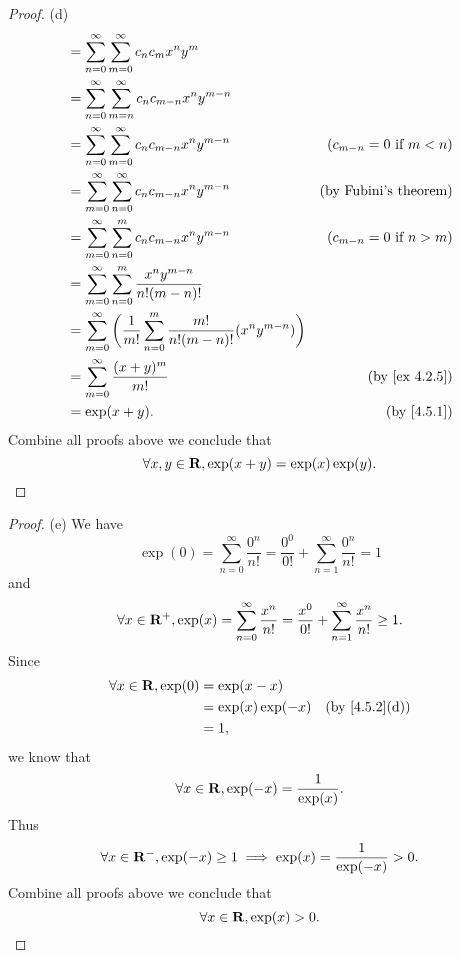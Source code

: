 \begin{proof}{(d)}
\begin{align*}
     & = \sum_{n = 0}^\infty \sum_{m = 0}^\infty c_n c_m x^n y^m                                                                                \\
     & = \sum_{n = 0}^\infty \sum_{m = n}^\infty c_n c_{m - n} x^n y^{m - n}                                                                    \\
     & = \sum_{n = 0}^\infty \sum_{m = 0}^\infty c_n c_{m - n} x^n y^{m - n}                                & (c_{m - n} = 0 \text{ if } m < n) \\
     & = \sum_{m = 0}^\infty \sum_{n = 0}^\infty c_n c_{m - n} x^n y^{m - n}                                & \text{(by Fubini's theorem)}      \\
     & = \sum_{m = 0}^\infty \sum_{n = 0}^m c_n c_{m - n} x^n y^{m - n}                                     & (c_{m - n} = 0 \text{ if } n > m) \\
     & = \sum_{m = 0}^\infty \sum_{n = 0}^m \frac{x^n y^{m - n}}{n! (m - n)!}                                                                   \\
     & = \sum_{m = 0}^\infty \bigg(\frac{1}{m!} \sum_{n = 0}^m \frac{m!}{n! (m - n)!} (x^n y^{m - n})\bigg)                                     \\
     & = \sum_{m = 0}^\infty \frac{(x + y)^m}{m!}                                                           & \text{(by \cref{ex 4.2.5})}       \\
     & = \exp(x + y).                                                                                       & \text{(by \cref{4.5.1})}
  \end{align*}
  Combine all proofs above we conclude that
  \[
    \forall x, y \in \mathbf{R}, \exp(x + y) = \exp(x) \exp(y).
  \]
\end{proof}

\begin{proof}{(e)}
  We have
  \[
    \exp(0) = \sum_{n = 0}^\infty \frac{0^n}{n!} = \frac{0^0}{0!} + \sum_{n = 1}^\infty \frac{0^n}{n!} = 1
  \]
  and
  \[
    \forall x \in \mathbf{R}^+, \exp(x) = \sum_{n = 0}^\infty \frac{x^n}{n!} = \frac{x^0}{0!} + \sum_{n = 1}^\infty \frac{x^n}{n!} \geq 1.
  \]
  Since
  \begin{align*}
    \forall x \in \R, \exp(0) & = \exp(x - x)                                    \\
                              & = \exp(x) \exp(-x) & \text{(by \cref{4.5.2}(d))} \\
                              & = 1,
  \end{align*}
  we know that
  \[
    \forall x \in \mathbf{R}, \exp(-x) = \frac{1}{\exp(x)}.
  \]
  Thus
  \[
    \forall x \in \mathbf{R}^-, \exp(-x) \geq 1 \implies \exp(x) = \frac{1}{\exp(-x)} > 0.
  \]
  Combine all proofs above we conclude that
  \[
    \forall x \in \mathbf{R}, \exp(x) > 0.
  \]
\end{proof}

